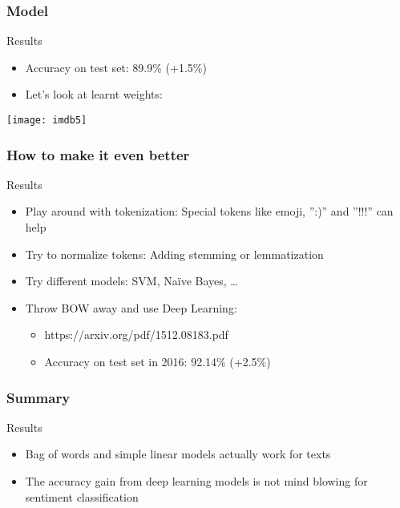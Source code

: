 \begin{frame}[fragile]\frametitle{Model}
Results

\begin{itemize}
\item Accuracy on test set: 89.9\% (+1.5\%)
\item Let's look at learnt weights:
  \end{itemize}

\begin{center}
\texttt{[image: imdb5]}
\end{center}
\end{frame}

\begin{frame}[fragile]\frametitle{How to make it even better}
Results

\begin{itemize}
\item Play around with tokenization: Special tokens like emoji, '':)'' and ''!!!'' can help
\item Try to normalize tokens: Adding stemming or lemmatization
\item Try different models: SVM, Naïve Bayes, \ldots
\item Throw BOW away and use Deep Learning: 
\begin{itemize}
\item  https://arxiv.org/pdf/1512.08183.pdf
\item Accuracy on test set in 2016: 92.14\% (+2.5\%)
  \end{itemize}
  \end{itemize}

\end{frame}

\begin{frame}[fragile]\frametitle{Summary}
Results

\begin{itemize}
\item Bag of words and simple linear models actually work for 
texts
\item  The accuracy gain from deep learning models is not mind 
blowing for sentiment classification
  \end{itemize}

\end{frame}





